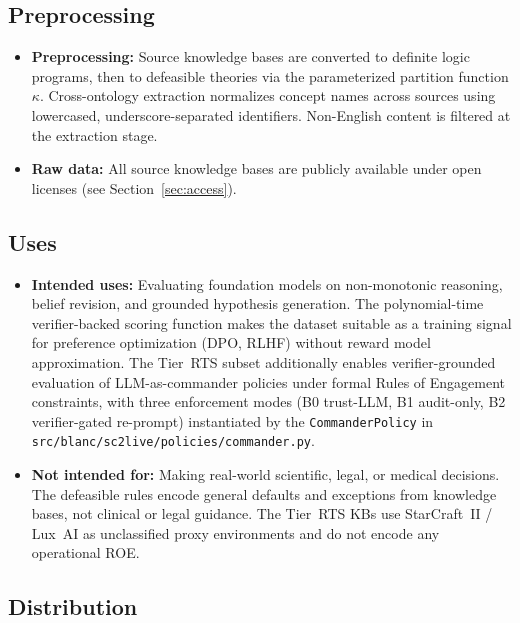 \documentclass{article}
\theoremstyle{definition}
\begin{document}
\subsection*{Preprocessing}

\begin{itemize}[nosep]
\item \textbf{Preprocessing:} Source knowledge bases are converted to definite logic programs, then to defeasible theories via the parameterized partition function $\kappa$. Cross-ontology extraction normalizes concept names across sources using lowercased, underscore-separated identifiers. Non-English content is filtered at the extraction stage.
\item \textbf{Raw data:} All source knowledge bases are publicly available under open licenses (see Section~\ref{sec:access}).
\end{itemize}

\subsection*{Uses}

\begin{itemize}[nosep]
\item \textbf{Intended uses:} Evaluating foundation models on non-monotonic reasoning, belief revision, and grounded hypothesis generation. The polynomial-time verifier-backed scoring function makes the dataset suitable as a training signal for preference optimization (DPO, RLHF) without reward model approximation. The Tier~RTS subset additionally enables verifier-grounded evaluation of LLM-as-commander policies under formal Rules of Engagement constraints, with three enforcement modes (B0 trust-LLM, B1 audit-only, B2 verifier-gated re-prompt) instantiated by the \texttt{CommanderPolicy} in \texttt{src/blanc/sc2live/policies/commander.py}.
\item \textbf{Not intended for:} Making real-world scientific, legal, or medical decisions. The defeasible rules encode general defaults and exceptions from knowledge bases, not clinical or legal guidance. The Tier~RTS KBs use StarCraft~II / Lux~AI as unclassified proxy environments and do not encode any operational ROE.
\end{itemize}

\subsection*{Distribution}
\end{document}
